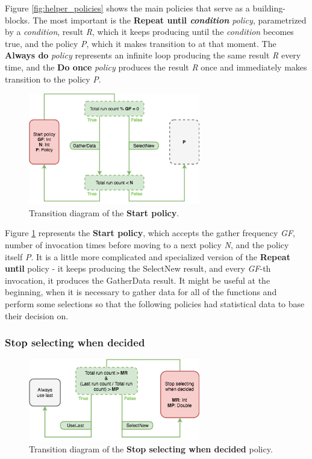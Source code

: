 Figure \ref{fig:helper_policies} shows the main policies that serve as a building-blocks. The most important is the \textbf{Repeat until \textit{condition}} \textit{policy}, parametrized by a \textit{condition}, result \textit{R}, which it keeps producing until the \textit{condition} becomes true, and the policy \textit{P}, which it makes transition to at that moment. The \textbf{Always do} \textit{policy} represents an infinite loop producing the same result \textit{R} every time, and the \textbf{Do once} \textit{policy} produces the result \textit{R} once and immediately makes transition to the policy \textit{P}.

\begin{figure}[h!]
	\captionsetup{justification=centering,margin=0.5cm}
	\centerline{\mbox{\includegraphics[width=75mm]{./img/start_policy.png}}}
	\caption{Transition diagram of the \textbf{Start policy}.}
	\label{fig:start_policy}
\end{figure}

Figure \ref{fig:start_policy} represents the \textbf{Start policy}, which accepts the gather frequency \textit{GF}, number of invocation times before moving to a next policy \textit{N}, and the policy itself \textit{P}. It is a little more complicated and specialized version of the \textbf{Repeat until} policy - it keeps producing the SelectNew result, and every \textit{GF}-th invocation, it produces the GatherData result. It might be useful at the beginning, when it is necessary to gather data for all of the functions and perform some selections so that the following policies had statistical data to base their decision on.

\subsubsection{Stop selecting when decided}

\begin{figure}[h!]
	\captionsetup{justification=centering,margin=0.5cm}
	\centerline{\mbox{\includegraphics[width=75mm]{./img/stop_selecting_when_decided.png}}}
	\caption{Transition diagram of the \textbf{Stop selecting  when decided} policy.}
	\label{fig:stop_selecting_when_decided}
\end{figure}

